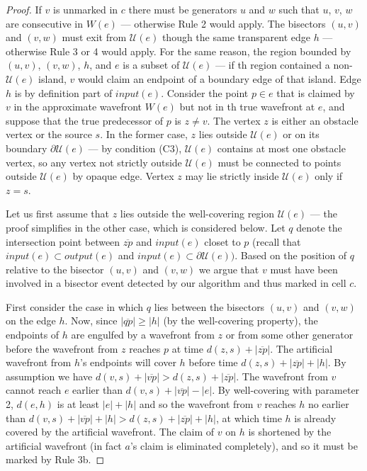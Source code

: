 \begin{proof}
	If $v$ is unmarked in $c$ there must be generators $u$ and $w$ such that
	$u$, $v$, $w$ are consecutive in $W(e)$ --- otherwise  Rule 2 would
	apply. The bisectors $(u,v)$ and $(v,w)$ must exit from $\mathcal{U}(e)$
	though the same transparent edge $h$ --- otherwise Rule 3 or 4 would
	apply. For the same reason, the region bounded by $(u,v)$, $(v,w)$, $h$,
	and $e$ is a subset of $\mathcal{U}(e)$ --- if th region contained a
	non-$\mathcal{U}(e)$ island, $v$ would claim an endpoint of a boundary
	edge of that island. Edge $h$ is by definition part of $input(e)$.
	Consider the point $p \in e$ that is claimed by $v$ in the approximate
	wavefront $W(e)$ but not in th true wavefront at $e$, and suppose that
	the true predecessor of $p$ is $z\neq v$. The vertex $z$ is either an
	obstacle vertex or the source $s$. In the former case, $z$ lies outside
	$\mathcal{U}(e)$ or on its boundary $\partial\mathcal{U}(e)$ --- by
	condition (C3), $\mathcal{U}(e)$ contains at most one obstacle vertex, so
	any vertex not strictly outside $\mathcal{U}(e)$ must be connected to
	points outside $\mathcal{U}(e)$ by opaque edge. Vertex $z$ may lie
	strictly inside $\mathcal{U}(e)$ only if $z=s$.

	Let us first assume that $z$ lies outside the well-covering region
	$\mathcal{U}(e)$ --- the proof simplifies in the other case, which is
	considered below. Let $q$ denote the intersection point between
	$\overline{zp}$ and $input(e)$ closet to $p$ (recall that $input(e)
	\subset output(e)$ and $input(e) \subset \partial\mathcal{U}(e))$. Based
	on the position of $q$ relative  to the bisector $(u,v)$ and $(v,w)$ we
	argue that $v$ must have been involved in a bisector event detected by
	our algorithm and thus marked in cell $c$.

	First consider the case in which $q$ lies between the bisectors $(u,v)$
	and $(v,w)$ on the edge $h$. Now, since $|\overline{qp}|\geq|h|$ (by the
	well-covering property), the endpoints of $h$ are engulfed by a wavefront
	from $z$ or from some other generator before the wavefront from $z$
	reaches $p$ at time $d(z,s) + |\overline{zp}|$. The artificial wavefront
	from $h$'s endpoints will cover $h$ before time
	$d(z,s)+|\overline{zp}|+|h|$. By assumption we have
	$d(v,s)+|\overline{vp}| > d(z,s)+|\overline{zp}|$. The wavefront from $v$
	cannot reach $e$ earlier than $d(v,s)+|\overline{vp}| - |e|$. By
	well-covering with parameter 2, $d(e,h)$ is at least $|e|+|h|$ and so the
	wavefront from $v$ reaches $h$ no earlier than
	$d(v,s)+|\overline{vp}|+|h|>d(z,s)+|\overline{zp}|+|h|$, at which time
	$h$ is already covered by the artificial wavefront. The claim of $v$ on
	$h$ is shortened by the artificial wavefront (in fact $a$'s claim is
	eliminated completely), and so it must be marked by Rule 3b.


\end{proof}
